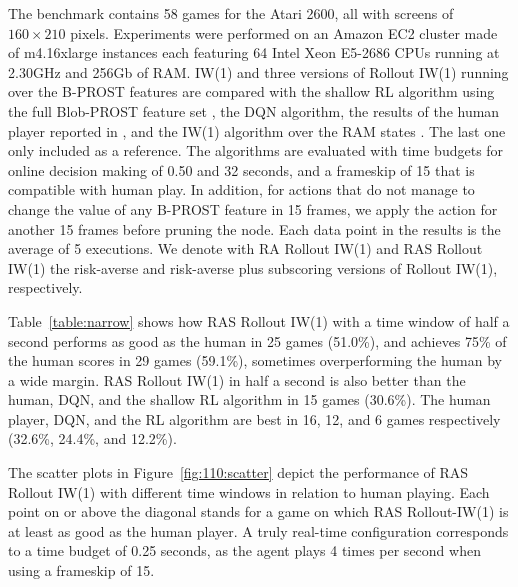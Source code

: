 \documentclass[letterpaper]{article}
\newcommand{\game}[1]{{\footnotesize\texttt{#1}}}
\begin{document}
The benchmark contains 58 games for the Atari 2600, all with screens of $160\times210$
pixels.
Experiments were performed on an Amazon EC2 cluster made of m4.16xlarge
instances each featuring 64 Intel Xeon E5-2686 CPUs running at 2.30GHz
and 256Gb of RAM.
IW(1) and three versions of Rollout IW(1) running over the B-PROST features
are compared with the shallow RL algorithm using the full Blob-PROST feature
set \cite{shallow}, the DQN algorithm, the results of the human player
reported in \cite{dqn}, and the IW(1) algorithm over the RAM states \cite{nir:ijcai2015}.
The last one only included as a reference.
The algorithms are evaluated with time budgets for online decision making of
0.50 and 32 seconds, and a frameskip of 15 that is compatible with human play.
In addition, for actions that do not manage to change the value of any B-PROST
feature in 15 frames, we apply the action for another 15 frames before pruning
the node. Each data point in the results is the average of 5 executions.
We denote with RA Rollout IW(1) and RAS Rollout IW(1) the risk-averse and
risk-averse plus subscoring versions of Rollout IW(1), respectively.

Table~\ref{table:narrow} shows how RAS Rollout IW(1) with a time window of half
a second performs as good as the human in 25 games (51.0\%), and achieves 75\%
of the human scores in 29 games (59.1\%), sometimes overperforming the human by
a wide margin.
RAS Rollout IW(1) in half a second is also better than the human, DQN, and the
shallow RL algorithm in 15 games (30.6\%).
The human player, DQN, and the RL algorithm are best in 16, 12, and 6 games
respectively (32.6\%, 24.4\%, and 12.2\%).

The scatter plots in Figure~\ref{fig:110:scatter} depict the performance of RAS
Rollout IW(1) with different time windows in relation to human playing.
Each point on or above the diagonal stands for a game on which RAS Rollout-IW(1)
is at least as good as the human player. A truly real-time configuration corresponds
to a time budget of 0.25 seconds, as the agent plays 4 times per second when using
a frameskip of 15.
\end{document}
